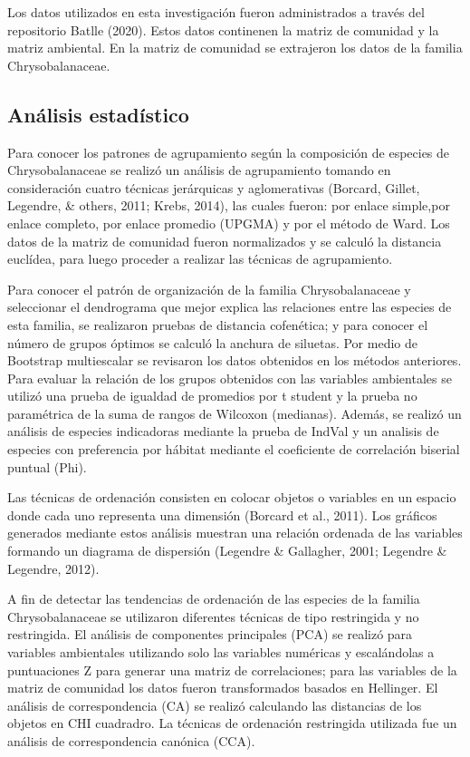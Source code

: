 \documentclass[11pt,]{article}
\begin{document}
Los datos utilizados en esta investigación fueron administrados a través
del repositorio Batlle (2020). Estos datos continenen la matriz de
comunidad y la matriz ambiental. En la matriz de comunidad se extrajeron
los datos de la familia Chrysobalanaceae.

\subsection{Análisis estadístico}\label{anuxe1lisis-estaduxedstico}

Para conocer los patrones de agrupamiento según la composición de
especies de Chrysobalanaceae se realizó un análisis de agrupamiento
tomando en consideración cuatro técnicas jerárquicas y aglomerativas
(Borcard, Gillet, Legendre, \& others, 2011; Krebs, 2014), las cuales
fueron: por enlace simple,por enlace completo, por enlace promedio
(UPGMA) y por el método de Ward. Los datos de la matriz de comunidad
fueron normalizados y se calculó la distancia euclídea, para luego
proceder a realizar las técnicas de agrupamiento.

Para conocer el patrón de organización de la familia Chrysobalanaceae y
seleccionar el dendrograma que mejor explica las relaciones entre las
especies de esta familia, se realizaron pruebas de distancia cofenética;
y para conocer el número de grupos óptimos se calculó la anchura de
siluetas. Por medio de Bootstrap multiescalar se revisaron los datos
obtenidos en los métodos anteriores. Para evaluar la relación de los
grupos obtenidos con las variables ambientales se utilizó una prueba de
igualdad de promedios por t student y la prueba no paramétrica de la
suma de rangos de Wilcoxon (medianas). Además, se realizó un análisis de
especies indicadoras mediante la prueba de IndVal y un analisis de
especies con preferencia por hábitat mediante el coeficiente de
correlación biserial puntual (Phi).

Las técnicas de ordenación consisten en colocar objetos o variables en
un espacio donde cada uno representa una dimensión (Borcard et al.,
2011). Los gráficos generados mediante estos análisis muestran una
relación ordenada de las variables formando un diagrama de dispersión
(Legendre \& Gallagher, 2001; Legendre \& Legendre, 2012).

A fin de detectar las tendencias de ordenación de las especies de la
familia Chrysobalanaceae se utilizaron diferentes técnicas de tipo
restringida y no restringida. El análisis de componentes principales
(PCA) se realizó para variables ambientales utilizando solo las
variables numéricas y escalándolas a puntuaciones Z para generar una
matriz de correlaciones; para las variables de la matriz de comunidad
los datos fueron transformados basados en Hellinger. El análisis de
correspondencia (CA) se realizó calculando las distancias de los objetos
en CHI cuadradro. La técnicas de ordenación restringida utilizada fue un
análisis de correspondencia canónica (CCA).
\end{document}
